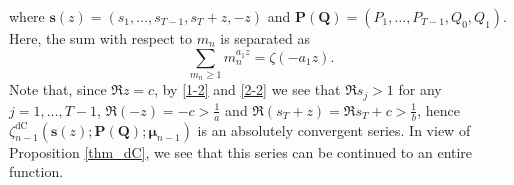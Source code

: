 \documentclass[a4paper,12pt]{article}
\theoremstyle{definition}
\numberwithin{equation}{section}
\newcommand{\dc}{\mathrm{dC}}
\newcommand{\dd}{d}
\newcommand{\ii}{i}
\begin{document}
where
$\mathbf{s}(z)=(s_1,\ldots,s_{T-1},s_T+z,-z)$ and
$\mathbf{P(Q)}=(P_1,\ldots,P_{T-1},Q_0,Q_1)$.
Here, the sum with respect to $m_n$ is separated as 
$$
\sum_{m_n\geq 1}m_n^{a_1 z}=\zeta(-a_1 z).
$$
Note that, since $\Re z=c$, by \eqref{1-2} and \eqref{2-2} we see that
$\Re s_j>1$ for any $j=1,\ldots, T-1$, $\Re(-z)=-c>\frac{1}{a}$ and
$\Re(s_T+z)=\Re s_T+c>\frac{1}{b}$, 
hence $\zeta_{n-1}^{\dc}(\mathbf{s}(z);\mathbf{P(Q)};\boldsymbol{\mu}_{n-1})$ is an absolutely convergent series.
In view of Proposition \ref{thm_dC}, we see that
this series can be continued to an entire function.

\end{document}
